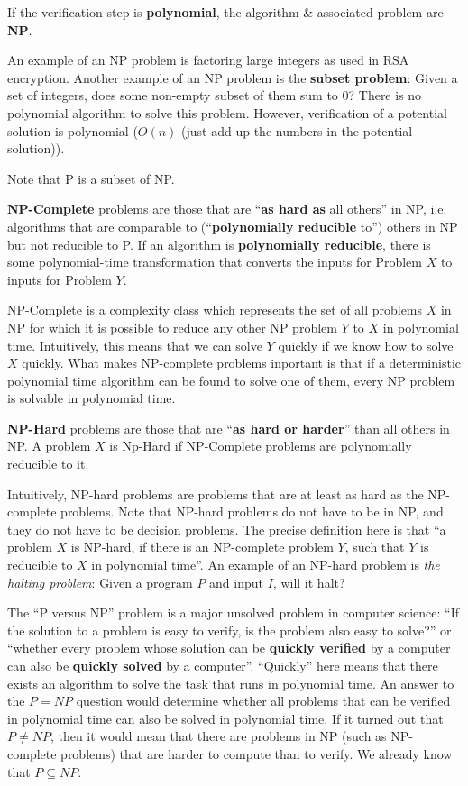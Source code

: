 \documentclass[11pt]{article}
\begin{document}
If the verification step is \textbf{polynomial}, the algorithm \& associated problem are \textbf{NP}. 

An example of an NP problem is factoring large integers as used in RSA encryption.
Another example of an NP problem is the \textbf{subset problem}: 
Given a set of integers, does some non-empty subset of them sum to 0?
There is no polynomial algorithm to solve this problem. 
However, verification of a potential solution is polynomial ($O(n)$ (just add up the numbers in the 
potential solution)).

Note that P is a subset of NP.

\textbf{NP-Complete} problems are those that are ``\textbf{as hard as} all others'' in NP, i.e. algorithms that 
are comparable to (``\textbf{polynomially reducible} to'') others in NP but not reducible to P. 
If an algorithm is \textbf{polynomially reducible}, there is some polynomial-time transformation that 
converts the inputs for Problem $X$ to inputs for Problem $Y$.

NP-Complete is a complexity class which represents the set of all problems $X$ in NP for which it is 
possible to reduce any other NP problem $Y$ to $X$ in polynomial time.
Intuitively, this means that we can solve $Y$ quickly if we know how to solve $X$ quickly.
What makes NP-complete problems inportant is that if a deterministic polynomial time algorithm can be 
found to solve one of them, every NP problem is solvable in polynomial time.

\textbf{NP-Hard} problems are those that are ``\textbf{as hard or harder}'' than all others in NP.
A problem $X$ is Np-Hard if NP-Complete problems are polynomially reducible to it.

Intuitively, NP-hard problems are problems that are at least as hard as the NP-complete problems.
Note that NP-hard problems do not have to be in NP, and they do not have to be decision problems.
The precise definition here is that ``a problem $X$ is NP-hard, if there is an NP-complete problem $Y$, 
such that $Y$ is reducible to $X$ in polynomial time''.
An example of an NP-hard problem is \textit{the halting problem}: Given a program $P$ and input $I$, 
will it halt?

The ``P versus NP'' problem is a major unsolved problem in computer science:
``If the solution to a problem is easy to verify, is the problem also easy to solve?'' or ``whether 
every problem whose solution can be \textbf{quickly verified} by a computer can also be \textbf{quickly solved} 
by a computer''.
``Quickly'' here means that there exists an algorithm to solve the task that runs in polynomial time.
An answer to the $P = NP$ question would determine whether all problems that can be verified in polynomial time can also be solved in 
polynomial time. 
If it turned out that $P \neq NP$, then it would mean that there are problems in NP (such as NP-complete problems) that are harder to compute  
than to verify. 
We already know that $P \subseteq NP$. 
\end{document}
